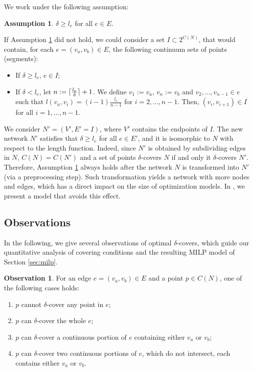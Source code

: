 \documentclass[review]{elsarticle}
\newcommand{\dlt}{{\delta}}
\DeclarePairedDelimiter\ceil{\lceil}{\rceil}
\theoremstyle{definition}
\newtheorem{observation}{Observation}[section]
\newtheorem{assumption}{Assumption}[section]
\begin{document}
We work under the following assumption:
\begin{assumption} \label{assumption}
$\dlt \ge l_e$ for all $e \in E$.
\end{assumption}
If Assumption \ref{assumption} did not hold, we could consider a set $I \subset  2^{C(N)}$, that would contain, for each $e = (v_a, v_b) \in E$, the following continuum sets of points (segments):
\begin{itemize}
	\item If $\dlt \ge l_e$, $e \in I$;
	\item If $\dlt < l_e$, let  $n:= \ceil{\frac{l_e}{\dlt}}+1$. We define $v_1:= v_a$, $v_n:= v_b$ and $v_2,\hdots, v_{n-1}\in e$ such that $l(v_a,v_i) = (i -1) \frac{l_e}{n-1}$ for $i=2,\ldots, n-1$. Then, $(v_{i}, v_{i+1}) \in I$ for all $i=1,\ldots,n-1$.
\end{itemize}
We consider $N'=(V',E'=I)$, where $V'$ contains the endpoints of $I$. The new network $N'$ satisfies that $\dlt \ge l_e$ for all $e\in E'$, and it is isomorphic to $N$ with respect to the length function. Indeed, since $N'$ is obtained by subdividing edges in $N$,  $C(N)=C(N')$ and a set of points $\dlt$-covers $N$  if and only it $\dlt$-covers $N'$. Therefore, Assumption \ref{assumption} always holds after the network $N$ is transformed into $N'$ (via a preprocessing step). Such transformation yields a network with more nodes and edges, which has a direct impact on the size of optimization models. In , we present a model that avoids this effect.  

\subsection{Observations}
In the following, we give several observations of optimal $\dlt$-covers, which guide our quantitative analysis of covering conditions and the resulting MILP model of Section \ref{sec:milp}.

\begin{observation}
For an edge $e=(v_a, v_b) \in E$ and a point $p \in C(N)$, one of the following cases holds:
\begin{enumerate}
	\item   $p$ cannot $\delta$-cover any point in $e$;
	\item $p$ can $\delta$-cover the whole $e$;
	\item $p$ can $\delta$-cover a continuous portion of $e$ containing either $v_a$ or $v_b$;
	\item $p$ can $\delta$-cover two continuous portions of $e$, which do not intersect, each contains either $v_a$ or $v_b$.
\end{enumerate}
\end{observation}
\end{document}
